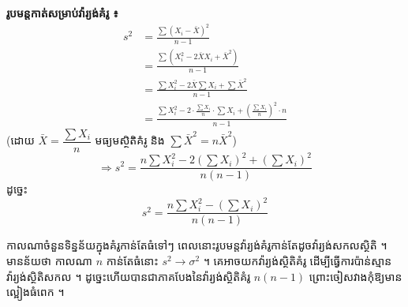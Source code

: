 \textbf{រូបមន្តកាត់សម្រាប់វ៉ារ្យង់គំរូ ៖}
\[
\begin{aligned}
s^2 &= \frac{\sum(X_i - \bar{X})^2}{n - 1}\\
&= \frac{\sum(X_i^2 - 2\bar{X}X_i + \bar{X}^2)}{n - 1}\\
&= \frac{\sum X_i^2 - 2\bar{X}\sum X_i + \sum\bar{X}^2}{n - 1}\\
&= \frac{\sum X_i^2 - 2\cdot\frac{\sum X_i}{n}\cdot\sum X_i + \left(\frac{\sum X_i}{n}\right)^2\cdot n}{n - 1}
\end{aligned}
\]
(ដោយ $\bar{X} = \dfrac{\sum X_i}{n}$ មធ្យមស្ថិតិគំរូ និង $\sum\bar{X}^2 = n\bar{X}^2$)
\[
\Rightarrow s^2 = \frac{n\sum X_i^2 - 2\left(\sum X_i\right)^2 + \left(\sum X_i\right)^2}{n(n - 1)}
\]
ដូច្នេះ
\[
s^2 = \frac{n\sum X_i^2 - \left(\sum X_i\right)^2}{n(n - 1)}
\]

\begin{note}[សម្គាល់]
កាលណាចំនួនទិន្នន័យក្នុងគំរូកាន់តែធំទៅៗ ពេលនោះរូបមន្តវ៉ារ្យង់គំរូកាន់តែដូចវ៉ារ្យង់សកលស្ថិតិ ។ មានន័យថា កាលណា $n$ កាន់តែធំនោះ $s^2 \to \sigma^2$ ។ គេអាចយកវ៉ារ្យង់ស្ថិតិគំរូ ដើម្បីធ្វើការប៉ាន់ស្មានវ៉ារ្យង់ស្ថិតិសកល ។ ដូច្នេះហើយបានជាភាគបែងនៃវ៉ារ្យង់ស្ថិតិគំរូ $n(n - 1)$ ព្រោះចៀសវាងកុំឱ្យមានល្អៀងធំពេក ។
\end{note}

